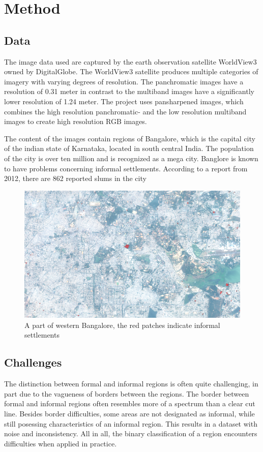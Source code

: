 
\section{Method}


\subsection{Data}

The image data used are captured by the earth observation satellite WorldView3
owned by DigitalGlobe. The WorldView3 satellite produces multiple categories of
imagery with varying degrees of resolution. The panchromatic images have
a resolution of 0.31 meter in contrast to  the multiband images have
a significantly lower resolution of
1.24 meter. The project uses pansharpened images, which combines the high
resolution panchromatic- and the low resolution multiband images to create
high resolution RGB images.

The content of the images contain regions of Bangalore, which is the capital
city of the indian state of Karnataka, located in south central India. The
population of the city is over ten million and is recognized as a mega city.
Banglore is known to have problems concerning informal settlements. According
to a report from 2012, there are 862 reported slums in the city


\begin{figure}
  \includegraphics[width=\linewidth]{images/west-bangalore}
  \caption{A part of western Bangalore, the red patches indicate informal
  settlements}
  \label{fig:west-bangalore}
\end{figure}

\subsection{Challenges}
The distinction between formal and informal regions is often quite challenging,
in part due to the vagueness of borders between the regions. The border between
formal and informal regions often resembles more of a spectrum than a clear cut line.
Besides border difficulties, some areas are not designated as informal, while
still posessing characteristics of an informal region. This results in
a dataset with noise and inconsistency.  All in all, the binary classification
of a region encounters difficulties when applied in practice. 


